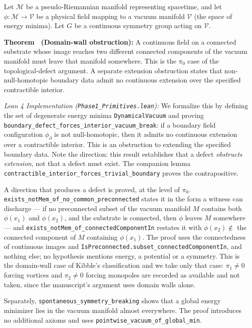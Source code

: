 \documentclass{article}
\begin{document}
Let $\mathcal{M}$ be a pseudo-Riemannian manifold representing spacetime, and let $\phi: \mathcal{M} \to \mathcal{V}$ be a physical field mapping to a vacuum manifold $\mathcal{V}$ (the space of energy minima). Let $G$ be a continuous symmetry group acting on $\mathcal{V}$.

\label{thm:supp-boundary}
\textbf{Theorem \thesuppresult\ (Domain-wall obstruction):} A continuous field on a connected substrate whose image reaches two different connected components of the vacuum manifold must leave that manifold somewhere. This is the $\pi_0$ case of the topological-defect argument. A separate extension obstruction states that non-null-homotopic boundary data admit no continuous extension over the specified contractible interior.

\textit{Lean 4 Implementation (\nolinkurl{Phase1_Primitives.lean}):} We formalize this by defining the set of degenerate energy minima \texttt{DynamicalVacuum} and proving \nolinkurl{boundary_defect_forces_interior_vacuum_break}: if a boundary field configuration $\phi_{\partial}$ is not null-homotopic, then it admits no continuous extension over a contractible interior. This is an obstruction to extending the specified boundary data. Note the direction: this result establishes that a defect \emph{obstructs extension}, not that a defect must exist. The companion lemma \nolinkurl{contractible_interior_forces_trivial_boundary}  proves the contrapositive.

A direction that produces a defect is proved, at the level of $\pi_0$. \nolinkurl{exists_notMem_of_no_common_preconnected} states it in the form a witness can discharge --- if no preconnected subset of the vacuum manifold $M$ contains both $\phi(x_1)$ and $\phi(x_2)$, and the substrate is connected, then $\phi$ leaves $M$ somewhere --- and \nolinkurl{exists_notMem_of_connectedComponentIn} restates it with $\phi(x_2) \notin$ the connected component of $M$ containing $\phi(x_1)$. The proof uses the connectedness of continuous images and \nolinkurl{IsPreconnected.subset_connectedComponentIn}, and nothing else; no hypothesis mentions energy, a potential or a symmetry. This is the domain-wall case of Kibble's classification and we take only that case: $\pi_1 \ne 0$ forcing vortices and $\pi_2 \ne 0$ forcing monopoles are recorded as available and not taken, since the manuscript's argument uses domain walls alone.

Separately, \nolinkurl{spontaneous_symmetry_breaking} shows that a global energy minimizer lies in the vacuum manifold almost everywhere. The proof introduces no additional axioms and uses \nolinkurl{pointwise_vacuum_of_global_min}.
\end{document}
